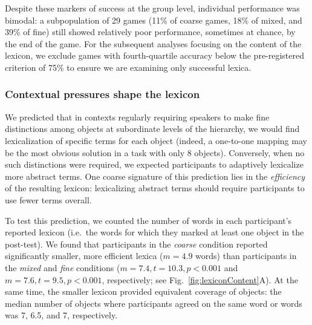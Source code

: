Despite these markers of success at the group level, individual performance was bimodal: a subpopulation of 29 games (11\% of coarse games, 18\% of mixed, and 39\% of fine) still showed relatively poor performance, sometimes at chance, by the end of the game. For the subsequent analyses focusing on the content of the lexicon, we exclude games with fourth-quartile accuracy below the pre-registered criterion of 75\% to ensure we are examining only successful lexica. %

\subsubsection{Contextual pressures shape the lexicon}

We predicted that in contexts regularly requiring speakers to make fine distinctions among objects at subordinate levels of the hierarchy, we would find lexicalization of specific terms for each object (indeed, a one-to-one mapping may be the most obvious solution in a task with only 8 objects). Conversely, when no such distinctions were required, we expected participants to adaptively lexicalize more abstract terms. One coarse signature of this prediction lies in the \emph{efficiency} of the resulting lexicon: lexicalizing abstract terms should require participants to use fewer terms overall.

To test this prediction, we counted the number of words in each participant's reported lexicon (i.e.\ the words for which they marked at least one object in the post-test). We found that participants in the \emph{coarse} condition reported significantly smaller, more efficient lexica ($m = 4.9$ words) than participants in the \emph{mixed} and \emph{fine} conditions ($m = 7.4, t = 10.3, p <0.001$ and $m = 7.6, t = 9.5, p < 0.001$, respectively; see Fig.\ \ref{fig:lexiconContent}A). At the same time, the smaller lexicon provided equivalent coverage of objects: the median number of objects where participants agreed on the same word or words was 7, 6.5, and 7, respectively. 

